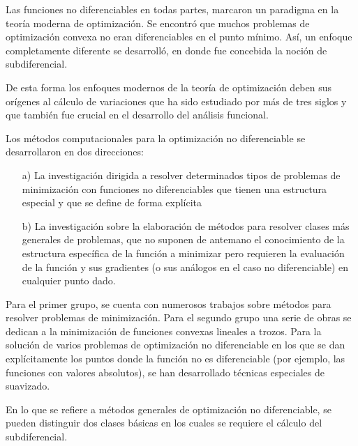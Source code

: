 Las funciones no diferenciables en todas partes, marcaron un paradigma en la teor\'ia moderna de
optimizaci\'on. Se encontr\'o que muchos problemas de optimizaci\'on convexa no eran diferenciables
en el punto m\'inimo. As\'i, un enfoque completamente diferente se desarroll\'o, en donde fue 
concebida la noci\'on de subdiferencial.

De esta forma los enfoques modernos de la teor\'ia de optimizaci\'on deben sus or\'igenes al 
c\'alculo de variaciones que ha sido estudiado por más de tres siglos y que tambi\'en fue crucial en
el desarrollo del an\'alisis funcional.\medskip

Los m\'etodos computacionales para la optimizaci\'on no diferenciable se desarrollaron en dos direcciones:

\begin{itemize}
   \item[a)] La investigaci\'on dirigida a resolver determinados tipos de problemas de minimizaci\'on con funciones no diferenciables que
	     tienen una estructura especial y que se define de forma expl\'icita 
   \item[b)] La investigaci\'on sobre la elaboraci\'on de m\'etodos para resolver clases m\'as generales de problemas, que no suponen de
	     antemano el conocimiento de la estructura espec\'ifica de la funci\'on a minimizar pero requieren la evaluaci\'on de la funci\'on
	     y sus gradientes (o sus an\'alogos en el caso no diferenciable) en cualquier punto dado.
\end{itemize}

Para el primer grupo, se cuenta con numerosos trabajos sobre m\'etodos para resolver problemas de minimizaci\'on. Para el segundo grupo una 
serie de obras se dedican a la minimizaci\'on de funciones convexas lineales a trozos. Para la solución de varios problemas de optimizaci\'on
no diferenciable en los que se dan expl\'icitamente los puntos donde la funci\'on no es diferenciable (por ejemplo, las funciones con valores
absolutos), se han desarrollado t\'ecnicas especiales de suavizado.
\medskip

En lo que se refiere a m\'etodos generales de optimizaci\'on no diferenciable, se pueden distinguir dos clases b\'asicas en los cuales se 
requiere el c\'alculo del subdiferencial.

